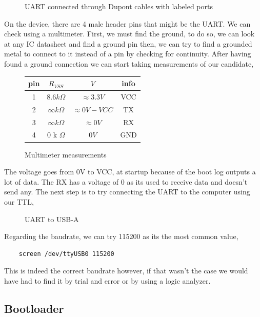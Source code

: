 \documentclass{article}
\begin{document}
\begin{figure}[!ht]
	
	\caption{UART connected through Dupont cables with labeled ports}
\end{figure}
\newpage

\noindent On the device, there are 4 male header pins that might be the UART. We can check using a multimeter. First, we must find the ground, to do so, we can look at any IC datasheet and find a ground pin then, we can try to find a grounded metal to connect to it instead of a pin by checking for continuity. After having found a ground connection we can start taking measurements of our candidate,
\begin{figure}[!ht]
	\centering
	\begin{tabular}{|c|c|c|c|}
		\hline
		pin & $R_{VSS}$ & $V$ & info \\ 
		\hline
		1 & $8.6k\Omega$ & $\approx 3.3V$ & VCC \\
		2 & $\infty k\Omega$ & $\approx 0V - VCC$ & TX\\
		3 & $\infty k\Omega$ & $\approx 0V$ & RX \\
		4 & $0$ k $\Omega$ & $0V$ & GND \\
		\hline
	\end{tabular}
	\caption{Multimeter measurements}
\end{figure}

\noindent The voltage goes from 0V to VCC, at startup because of the boot log outputs a lot of data. The RX has a voltage of 0 as its used to receive data and doesn't send any. The next step is to try connecting the UART to the computer using our TTL, 
\begin{figure}[!ht]
	\centering
	
	\caption{UART to USB-A }
\end{figure}

\noident Regarding the baudrate, we can try 115200 as its the most common value,
\begin{lstlisting}
	screen /dev/ttyUSB0 115200
\end{lstlisting} 
This is indeed the correct baudrate however, if that wasn't the case we would have had to find it by trial and error or by using a logic analyzer.
\subsection{Bootloader}
\end{document}
